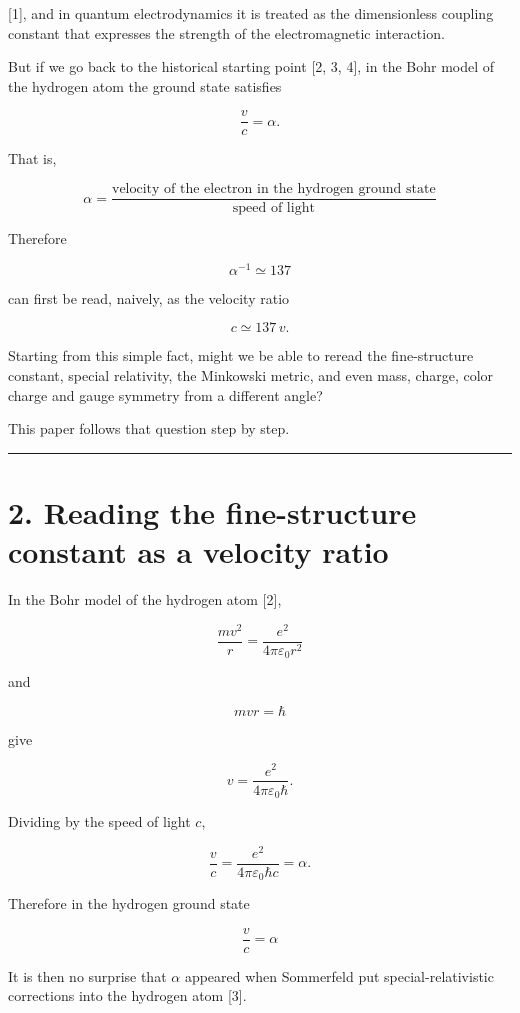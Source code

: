 \documentclass[
  a4paper,
]{article}
\begin{document}
{[}1{]}, and in quantum electrodynamics it is treated as the
dimensionless coupling constant that expresses the strength of the
electromagnetic interaction.

But if we go back to the historical starting point {[}2, 3, 4{]}, in the
Bohr model of the hydrogen atom the ground state satisfies

\[
\frac{v}{c}=\alpha .
\]

That is,

\[
\boxed{\alpha=\frac{\text{velocity of the electron in the hydrogen ground state}}{\text{speed of light}}}
\]

Therefore

\[
\alpha^{-1}\simeq137
\]

can first be read, naively, as the velocity ratio

\[
c\simeq137\,v .
\]

Starting from this simple fact, might we be able to reread the
fine-structure constant, special relativity, the Minkowski metric, and
even mass, charge, color charge and gauge symmetry from a different
angle?

This paper follows that question step by step.

\begin{center}\rule{0.5\linewidth}{0.5pt}\end{center}

\section{2. Reading the fine-structure constant as a velocity
ratio}\label{reading-the-fine-structure-constant-as-a-velocity-ratio}

In the Bohr model of the hydrogen atom {[}2{]},

\[
\frac{mv^2}{r}
=
\frac{e^2}{4\pi\varepsilon_0r^2}
\]

and

\[
mvr=\hbar
\]

give

\[
v=
\frac{e^2}{4\pi\varepsilon_0\hbar}.
\]

Dividing by the speed of light \(c\),

\[
\frac vc
=
\frac{e^2}{4\pi\varepsilon_0\hbar c}
=\alpha.
\]

Therefore in the hydrogen ground state

\[
\boxed{\frac vc=\alpha}
\]

It is then no surprise that \(\alpha\) appeared when Sommerfeld put
special-relativistic corrections into the hydrogen atom {[}3{]}.
\end{document}
